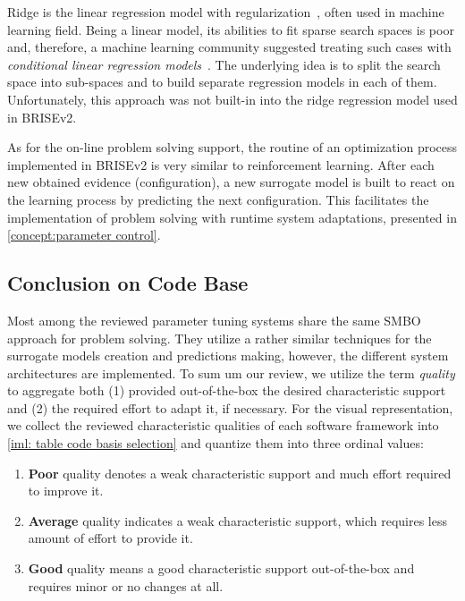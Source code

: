 Ridge is the linear regression model with regularization~\cite{hoerl1970ridge}, often used in machine learning field. Being a linear model, its abilities to fit sparse search spaces is poor and, therefore, a machine learning community suggested treating such cases with \emph{conditional linear regression models}~\cite{DBLP:journals/corr/abs-1806-02326}. The underlying idea is to split the search space into sub-spaces and to build separate regression models in each of them. Unfortunately, this approach was not built-in into the ridge regression model used in BRISEv2.

As for the on-line problem solving support, the routine of an optimization process implemented in BRISEv2 is very similar to reinforcement learning. After each new obtained evidence (configuration), a new surrogate model is built to react on the learning process by predicting the next configuration. This facilitates the implementation of problem solving with runtime system adaptations, presented in \cref{concept:parameter control}.

\subsection{Conclusion on Code Base}\label{impl:hlh code basis conclusion}
Most among the reviewed parameter tuning systems share the same SMBO approach for problem solving. They utilize a rather similar techniques for the surrogate models creation and predictions making, however, the different system architectures are implemented. To sum um our review, we utilize the term \emph{quality} to aggregate both (1) provided out-of-the-box the desired characteristic support and (2) the required effort to adapt it, if necessary. For the visual representation, we collect the reviewed characteristic qualities of each software framework into \cref{iml: table code basis selection} and quantize them into three ordinal values:
\begin{enumerate}
	\item \textbf{Poor} quality denotes a weak characteristic support and much effort required to improve it.
	\item \textbf{Average} quality indicates a weak characteristic support, which requires less amount of effort to provide it.
	\item \textbf{Good} quality means a good characteristic support out-of-the-box and requires minor or no changes at all.
\end{enumerate}

